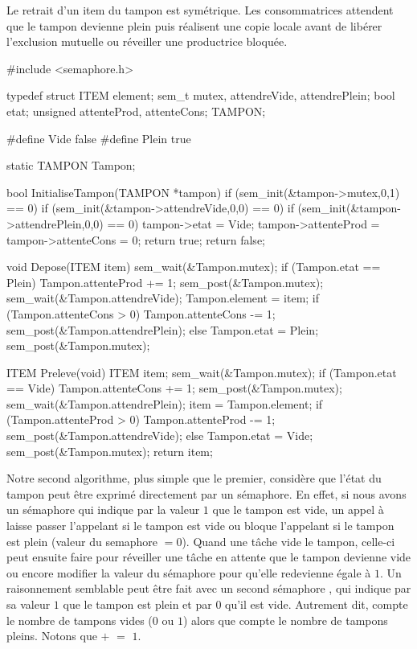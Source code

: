 Le retrait d'un item du tampon est symétrique. Les consommatrices attendent que le tampon devienne plein puis réalisent une copie locale avant de libérer l'exclusion mutuelle ou réveiller une productrice bloquée.

\begin{codeblock}[title=Algorithme de synchronisation pour un tampon,label=prodcons:tampon1]
#include <semaphore.h>

typedef struct {
  ITEM element;
  sem_t mutex, attendreVide, attendrePlein;
  bool etat;
  unsigned attenteProd, attenteCons;
} TAMPON;

#define Vide false
#define Plein true

static TAMPON Tampon;

bool InitialiseTampon(TAMPON *tampon)
{
  if (sem_init(&tampon->mutex,0,1) == 0)
     if (sem_init(&tampon->attendreVide,0,0) == 0)
        if (sem_init(&tampon->attendrePlein,0,0) == 0) {
           tampon->etat = Vide;
           tampon->attenteProd = tampon->attenteCons = 0;
           return true;
        }
  return false;
}

void Depose(ITEM item)
{
  sem_wait(&Tampon.mutex);
  if (Tampon.etat == Plein) {
     Tampon.attenteProd += 1;
     sem_post(&Tampon.mutex);
     sem_wait(&Tampon.attendreVide);
  }
  Tampon.element = item;
  if (Tampon.attenteCons > 0) {
     Tampon.attenteCons -= 1;
     sem_post(&Tampon.attendrePlein);
  }
  else {
     Tampon.etat = Plein;
     sem_post(&Tampon.mutex);
  }
}

ITEM Preleve(void)
{
  ITEM item;
  sem_wait(&Tampon.mutex);
  if (Tampon.etat == Vide) {
     Tampon.attenteCons += 1;
     sem_post(&Tampon.mutex);
     sem_wait(&Tampon.attendrePlein);
  }
  item = Tampon.element;
  if (Tampon.attenteProd > 0) {
     Tampon.attenteProd -= 1;
     sem_post(&Tampon.attendreVide);
  }
  else {
     Tampon.etat = Vide;
     sem_post(&Tampon.mutex);
  }
  return item;
}
\end{codeblock}

Notre second algorithme, plus simple que le premier, considère que l'état du tampon peut être exprimé directement par un sémaphore. En effet, si nous avons un sémaphore  qui indique par la valeur $1$ que le tampon est vide, un appel à  laisse passer l'appelant si le tampon est vide ou bloque l'appelant si le tampon est plein (valeur du semaphore $= 0$). Quand une tâche vide le tampon, celle-ci peut ensuite faire  pour réveiller une tâche en attente que le tampon devienne vide ou encore modifier la valeur du sémaphore pour qu'elle redevienne égale à $1$. Un raisonnement semblable peut être fait avec un second sémaphore , qui indique par sa valeur $1$ que le tampon est plein et par $0$ qu'il est vide. Autrement dit,  compte le nombre de tampons vides ($0$ ou $1$) alors que  compte le nombre de tampons pleins. Notons que  $+$  $=$ $1$.

